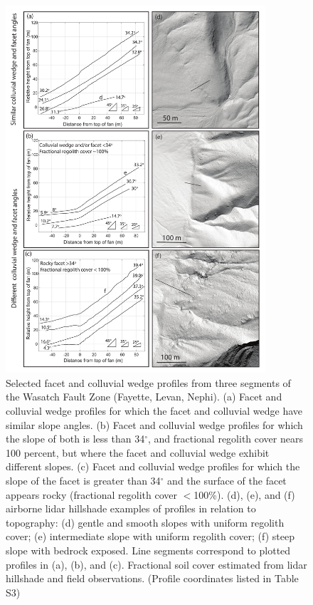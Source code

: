 \begin{figure}[ht!]
\centerline{\includegraphics[width=3.8in]{figure3.pdf}}
\caption{Selected facet and colluvial wedge profiles from
three segments of the Wasatch Fault Zone (Fayette, Levan, Nephi). (a)
Facet and colluvial wedge profiles for which the 
facet and colluvial wedge have similar slope angles. (b) Facet and
colluvial wedge profiles for which the slope of both is less than 34$^\circ$, 
and fractional regolith cover nears 100 percent, but where the facet
and colluvial wedge exhibit different slopes. (c) Facet and colluvial
wedge profiles for which the slope of the facet is greater than 34$^\circ$
and the surface of the facet appears rocky (fractional regolith cover
$<$100\%). %
(d), (e), and (f) airborne lidar hillshade examples of profiles in relation to
topography: (d) gentle and smooth slopes with uniform regolith cover;
(e) intermediate slope with uniform regolith cover; (f) steep
slope with bedrock exposed. Line segments
correspond to plotted profiles in (a), (b), and (c). Fractional soil
cover estimated from lidar hillshade and field observations. (Profile coordinates listed in Table S3)} 
\label{fig:profiles2}
\end{figure}


